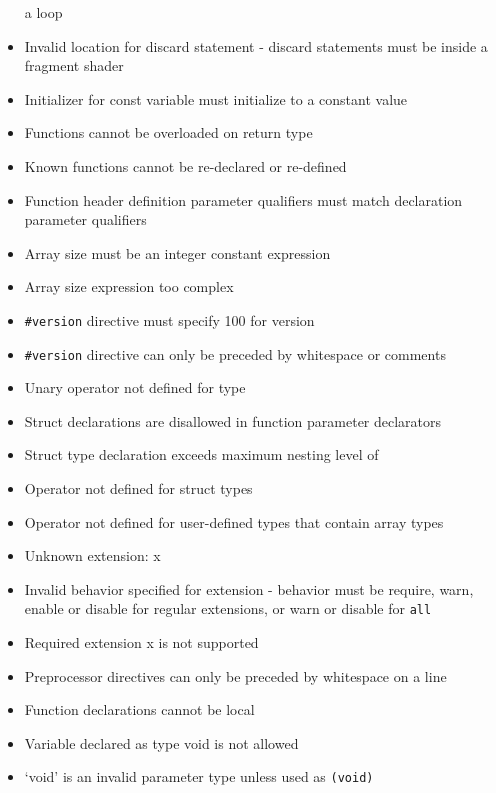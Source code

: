 \begin{itemize}
  a loop
\item
  Invalid location for discard statement - discard statements must be
  inside a fragment shader
\item
  Initializer for const variable must initialize to a constant value
\item
  Functions cannot be overloaded on return type
\item
  Known functions cannot be re-declared or re-defined
\item
  Function header definition parameter qualifiers must match declaration
  parameter qualifiers
\item
  Array size must be an integer constant expression
\item
  Array size expression too complex
\item
  \texttt{\#version} directive must specify 100 for version
\item
  \texttt{\#version} directive can only be preceded by whitespace or
  comments
\item
  Unary operator not defined for type
\item
  Struct declarations are disallowed in function parameter declarators
\item
  Struct type declaration exceeds maximum nesting level of
\item
  Operator not defined for struct types
\item
  Operator not defined for user-defined types that contain array types
\item
  Unknown extension: x
\item
  Invalid behavior specified for extension - behavior must be require,
  warn, enable or disable for regular extensions, or warn or disable for
  \texttt{all}
\item
  Required extension x is not supported
\item
  Preprocessor directives can only be preceded by whitespace on a line
\item
  Function declarations cannot be local
\item
  Variable declared as type void is not allowed
\item
  `void' is an invalid parameter type unless used as \texttt{(void)}
\end{itemize}
